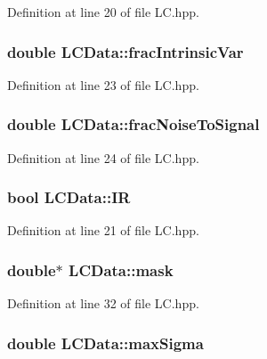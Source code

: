 Definition at line 20 of file L\-C.\-hpp.

\hypertarget{class_l_c_data_aba6416bcecc2ac9cee661b6afcb6f5c5}{
\subsubsection[{frac\-Intrinsic\-Var}]{\setlength{\rightskip}{0pt plus 5cm}double L\-C\-Data\-::frac\-Intrinsic\-Var}}\label{class_l_c_data_aba6416bcecc2ac9cee661b6afcb6f5c5}


Definition at line 23 of file L\-C.\-hpp.

\hypertarget{class_l_c_data_ae3b5e95e4eca1131359ca714343e59c4}{
\subsubsection[{frac\-Noise\-To\-Signal}]{\setlength{\rightskip}{0pt plus 5cm}double L\-C\-Data\-::frac\-Noise\-To\-Signal}}\label{class_l_c_data_ae3b5e95e4eca1131359ca714343e59c4}


Definition at line 24 of file L\-C.\-hpp.

\hypertarget{class_l_c_data_a42a0e899dba3e9b6fd7ae8fe3f577f22}{
\subsubsection[{I\-R}]{\setlength{\rightskip}{0pt plus 5cm}bool L\-C\-Data\-::\-I\-R}}\label{class_l_c_data_a42a0e899dba3e9b6fd7ae8fe3f577f22}


Definition at line 21 of file L\-C.\-hpp.

\hypertarget{class_l_c_data_adc13a3afaa98f9b6f9eebce2aea57a36}{
\subsubsection[{mask}]{\setlength{\rightskip}{0pt plus 5cm}double$\ast$ L\-C\-Data\-::mask}}\label{class_l_c_data_adc13a3afaa98f9b6f9eebce2aea57a36}


Definition at line 32 of file L\-C.\-hpp.

\hypertarget{class_l_c_data_a349cd84383e8bfda50d203b84ef5d527}{
\subsubsection[{max\-Sigma}]{\setlength{\rightskip}{0pt plus 5cm}double L\-C\-Data\-::max\-Sigma}}\label{class_l_c_data_a349cd84383e8bfda50d203b84ef5d527}


